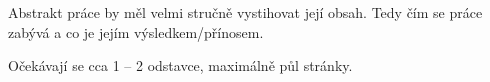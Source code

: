 \documentclass[11pt,twoside,a4paper]{book}
\begin{document}
	\noindent
	Abstrakt práce by měl velmi stručně vystihovat její obsah. Tedy čím se práce zabývá a co je jejím výsledkem/přínosem.

	\noindent
	Očekávají se cca 1 -- 2 odstavce, maximálně půl stránky.

	\tableofcontents		%

	\listoffigures			%
	\listoftables			%

	\mainbodystarts

% 
% 






%



%
{
\def\CS{$\cal C\kern-0.1667em\lower.5ex\hbox{$\cal S$}\kern-0.075em $}

}
\appendix	

\printnomenclature
\label{apx:zkratky}


\end{document}
